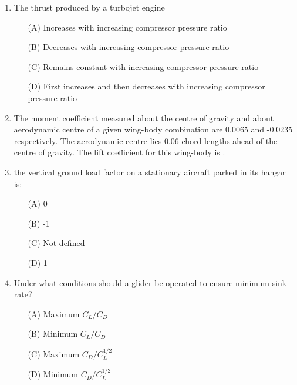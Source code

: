 \documentclass[journal]{IEEEtran}
\begin{document}
\begin{enumerate}
\vspace{0.5cm}
\item The thrust produced by a turbojet engine
\begin{itemize}
    \item[(A)] Increases with increasing compressor pressure ratio
    \item[(B)] Decreases with increasing compressor pressure ratio
    \item[(C)] Remains constant with increasing compressor pressure ratio
    \item[(D)] First increases and then decreases with increasing compressor pressure ratio
\end{itemize}
\vspace{0.5cm}
\item The moment coefficient measured about the centre of gravity and about aerodynamic centre of a given wing-body combination are 0.0065 and -0.0235 respectively. The aerodynamic centre lies 0.06 chord lengths ahead of the centre of gravity. The lift coefficient for this wing-body is \underline{\hspace{2cm}}.
\vspace{0.5cm}

\item the vertical ground load factor on a stationary aircraft parked in its hangar is:
\begin{multicols}{2}
\begin{itemize}
    \item[(A)] 0
    \item[(B)] -1
    \item[(C)] Not defined
    \item[(D)] 1
\end{itemize}
\end{multicols}

\vspace{0.5cm}

\item Under what conditions should a glider be operated to ensure minimum sink rate?
\begin{multicols}{2}
\begin{itemize}
    \item[(A)] Maximum $C_L/C_D$
    \item[(B)] Minimum $C_L/C_D$
    \item[(C)] Maximum $C_D/C_L^{1/2}$
    \item[(D)] Minimum $C_D/C_L^{1/2}$
\end{itemize}
\end{multicols}


\end{enumerate}
\end{document}
